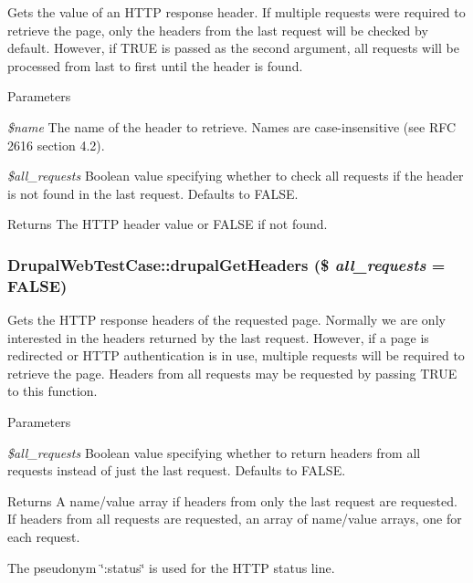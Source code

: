 \label{classDrupalWebTestCase_a2a5d661d1f61cf9ac2c8bb5969d5d373}
Gets the value of an HTTP response header. If multiple requests were required to retrieve the page, only the headers from the last request will be checked by default. However, if TRUE is passed as the second argument, all requests will be processed from last to first until the header is found.


\begin{DoxyParams}{Parameters}
\item[{\em \$name}]The name of the header to retrieve. Names are case-\/insensitive (see RFC 2616 section 4.2). \item[{\em \$all\_\-requests}]Boolean value specifying whether to check all requests if the header is not found in the last request. Defaults to FALSE. \end{DoxyParams}
\begin{DoxyReturn}{Returns}
The HTTP header value or FALSE if not found. 
\end{DoxyReturn}
\hypertarget{classDrupalWebTestCase_a9bbd6c61b69af17eeb79d59b1632a691}{
\subsubsection[{drupalGetHeaders}]{\setlength{\rightskip}{0pt plus 5cm}DrupalWebTestCase::drupalGetHeaders (\$ {\em all\_\-requests} = {\ttfamily FALSE})}}
\label{classDrupalWebTestCase_a9bbd6c61b69af17eeb79d59b1632a691}
Gets the HTTP response headers of the requested page. Normally we are only interested in the headers returned by the last request. However, if a page is redirected or HTTP authentication is in use, multiple requests will be required to retrieve the page. Headers from all requests may be requested by passing TRUE to this function.


\begin{DoxyParams}{Parameters}
\item[{\em \$all\_\-requests}]Boolean value specifying whether to return headers from all requests instead of just the last request. Defaults to FALSE. \end{DoxyParams}
\begin{DoxyReturn}{Returns}
A name/value array if headers from only the last request are requested. If headers from all requests are requested, an array of name/value arrays, one for each request.
\end{DoxyReturn}
The pseudonym \char`\"{}:status\char`\"{} is used for the HTTP status line.

